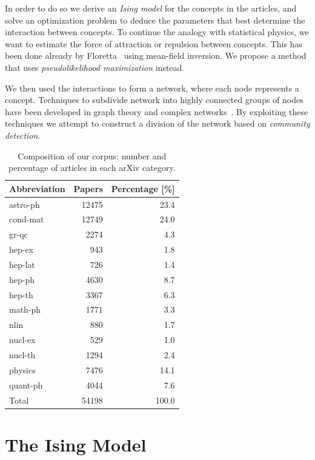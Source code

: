 \documentclass[a4paper,12pt,twoside]{article}
\begin{document}
In order to do so we derive an {\em Ising model} for the concepts in the articles, and solve an optimization problem to deduce the parameters that best determine the interaction between concepts.
To continue the analogy with statistical physics, we want to estimate the force of attraction or repulsion between concepts.
This has been done already by Floretta~\cite{flo2014} using mean-field inversion.
We propose a method that uses {\em pseudolikelihood maximization} instead.

We then used the interactions to form a network, where each node represents a concept.
Techniques to subdivide network into highly connected groups of nodes have been developed in graph theory and complex networks~\cite{newman2004}.
By exploiting these techniques we attempt to construct a division of the network based on {\em community detection}.

\begin{table}[h]
  \begin{center}
    \begin{tabular}{lrr}
    \hline
    Abbreviation & Papers & Percentage [\%] \\
    \hline
    astro-ph & 12475 & 23.4 \\
    cond-mat & 12749 & 24.0\\
    gr-qc & 2274 & 4.3\\
    hep-ex & 943 & 1.8\\
    hep-lat & 726 & 1.4\\
    hep-ph & 4630 & 8.7\\
    hep-th & 3367 & 6.3\\
    math-ph & 1771 & 3.3\\
    nlin & 880 & 1.7 \\
    nucl-ex & 529 & 1.0\\
    nucl-th & 1294 & 2.4\\
    physics & 7476 & 14.1\\
    quant-ph & 4044 & 7.6\\
    \hline
    Total & 54198 & 100.0 \\
    \hline
    \end{tabular}
  \caption{\label{tab:cats} Composition of our corpus: number and percentage of articles in each arXiv category.}
  \end{center}
\end{table} 
\section{The Ising Model}
\end{document}

